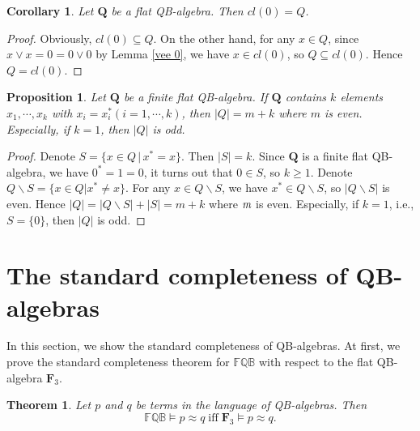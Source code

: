 \documentclass[12pt]{amsart}
\newtheorem{theorem}{Theorem}[section]
\newtheorem{corollary}{Corollary}[section]
\newtheorem{proposition}{Proposition}[section]
\theoremstyle{definition}
\theoremstyle{remark}
\numberwithin{equation}{section}
\begin{document}
\begin{corollary}\label{cl0Q}
Let $\mathbf{Q}$ be a flat QB-algebra. Then $cl(0)=Q$.
\end{corollary}
\begin{proof}
Obviously, $cl(0)\subseteq Q$. On the other hand, for any $x\in Q$, since $x\vee x=0=0\vee 0$ by Lemma \ref{vee 0}, we have $x\in cl(0)$, so $Q\subseteq cl(0)$. Hence $Q=cl(0)$.
\end{proof}


\begin{proposition}
Let $\mathbf{Q}$ be a finite flat QB-algebra. If $\mathbf{Q}$ contains $k$ elements $x_{1}, \cdots, x_{k}$ with $x_{i}=x_{i}^{\ast} (i=1,\cdots, k)$, then $|Q|=m+k$ where $m$ is even. Especially, if $k=1$, then $|Q|$ is odd.
\end{proposition}


\begin{proof}
Denote $S=\{x\in Q\,|\,x^{\ast}=x\}$. Then $|S|=k$. Since $\mathbf{Q}$ is a finite flat QB-algebra, we have $0^{\ast}=1=0$, it turns out that $0\in S$, so $k\geq 1$. Denote $Q\backslash S=\{x\in Q|x^{\ast}\neq x\}$. For any $x\in Q\backslash S$, we have $x^{\ast}\in Q\backslash S$, so $|Q\backslash S|$ is even. Hence $|Q|=|Q\backslash S|+|S|=m+k$ where $\emph{m}$ is even. Especially, if $k=1$, i.e., $S=\{0\}$, then $|Q|$ is odd.
\end{proof}


\section{The standard completeness of QB-algebras}

In this section, we show the standard completeness of QB-algebras. At first, we prove the standard completeness theorem for $\mathbb{FQB}$ with respect to the flat QB-algebra $ \mathbf{F}_{3}$.

\begin{theorem}\label{Proposition 4.1}
Let $p$ and $q$ be terms in the language of QB-algebras. Then
$$
\mathbb{FQB}\models p\approx q  \; \mathrm{iff}  \; \mathrm{\mathbf{F}_{3}}\models p\approx q.
$$
\end{theorem}
\end{document}

